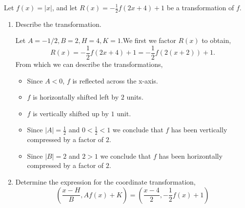 \documentclass[12pt]{article} %
\begin{document}
\newpage

\begin{qstn}
  Let $f(x) = \left|x\right|$, and let $R(x) = -\frac{1}{2}f(2x + 4) + 1$ be a transformation of $f$. 
  \begin{enumerate}[label=(\alph*)]
    \item Describe the transformation.
      \begin{solution}
        Let $A = -1 / 2, B = 2, H = 4, K = 1$.We first we factor $R(x)$ to obtain,
        \[
            R(x) = -\frac{1}{2}f(2x + 4) + 1 = -\frac{1}{2}f(2(x + 2)) + 1
        .\] 
        From which we can describe the transformations,
        \begin{itemize}
          \item Since $A < 0$, $f$ is reflected across the x-axis.
          \item $f$ is horizontally shifted left by $2$ units.
          \item $f$ is vertically shifted up by $1$ unit.
          \item Since $\left|A\right| = \frac{1}{2}$ and $0 < \frac{1}{2} < 1$ we conclude that $f$ has been
            vertically compressed by a factor of $2$.
          \item  Since $ \left|B\right| = 2$ and $2 > 1$ we conclude that $f$ has been horizontally compressed by a
            factor  of $2$.
        \end{itemize}
      \end{solution}

    \item Determine the expression for the coordinate transformation,
      \[
          \left( \frac{x- H}{B}, Af(x) + K \right) =
          \left( \frac{x - 4}{2}, -\frac{1}{2}f(x) + 1\right) 
      \] 
      \vspace*{1cm}


\end{enumerate}
\end{qstn}
\end{document}
